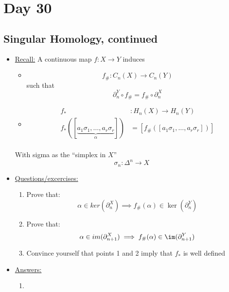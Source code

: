 \documentclass[../notes.tex]{subfiles}
\begin{document}
\section{Day 30}
\subsection{Singular Homology, continued}
\begin{itemize}
    \item \underline{Recall:} A continuous map $f:X\rightarrow Y$ induces
        \begin{itemize}
            \item 
                \[
                    f_{\#}: C_n(X)\rightarrow C_n(Y)
                \]
                such that
                \[
                    \partial_n^Y\circ f_{\#}=f_{\#}\circ \partial_n^X
                \]
            \item 
                \begin{align*}
                f_{*}&:H_n(X)\rightarrow H_n(Y)\\
                f_*([\underbrace{a_1\sigma_1,\dots,a_r\sigma_r}_{\alpha}])
                &=[f_{\#}([a_1\sigma_1,\dots,a_r\sigma_r])]\\
                \end{align*}
        \end{itemize}
        With sigma as the ``simplex in $X$''
        \[
            \sigma_n:\Delta^n\rightarrow X
        \]
    \item \underline{Questions/excercises:}
        \begin{enumerate}
            \item Prove that:
                \[
                    \alpha\in ker(\partial_n^X)\implies f_{\#}(\alpha)
                    \in \ker(\partial_n^Y)
                \]
            \item Prove that:
                \[
                    \alpha\in im(\partial_{n+1}^X)\implies f_{\#}(\alpha)
                    \in \im(\partial_{n+1}^Y)
                \]
            \item Convince yourself that points 1 and 2 imply that $f_{*}$ is
                well defined
        \end{enumerate}
    \item \underline{Answers:}
        \begin{enumerate}
            \item 
                \begin{align*}

\end{align*}
\end{enumerate}
\end{itemize}
\end{document}
